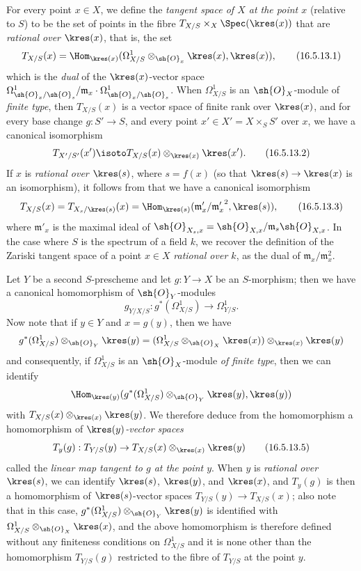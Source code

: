 \begin{env}[16.5.13]
\label{IV.16.5.13}
For every point $x \in X$, we define the \emph{tangent space of $X$ at the point $x$} (relative to $S$) to be the set of points in the fibre $T_{X/S} \times_X \Spec(\kres(x))$ that are \emph{rational over $\kres(x)$}, that is, the set
\[
\label{IV.16.5.13.1}
  T_{X/S}(x) = \Hom_{\kres(x)}(\Omega_{X/S}^1 \otimes_{\sh{O}_x} \kres(x), \kres(x)),
  \tag{16.5.13.1}
\]
which is the \emph{dual} of the $\kres(x)$-vector space $\Omega_{\sh{O}_x/\sh{O}_s}^1/\mathfrak{m}_x \cdot \Omega_{\sh{O}_x/\sh{O}_s}^1$.
When $\Omega_{X/S}^1$ is an $\sh{O}_X$-module of \emph{finite type}, then $T_{X/S}(x)$ is a vector space of finite rank over $\kres(x)$, and for every base change
$g : S' \to S$, and every point $x' \in X' = X \times_S S'$ over $x$, we have a canonical isomorphism
\[
  \label{IV.16.5.13.2}
  T_{X'/S'}(x') \isoto T_{X/S}(x) \otimes_{\kres(x)} \kres(x').
  \tag{16.5.13.2}
\]
If $x$ is \emph{rational over $\kres(s)$}, where $s = f(x)$ (so that $\kres(s) \to \kres(x)$ is an isomorphism), it follows from  that we have a canonical isomorphism
\[
\label{IV.16.5.13.3}
  T_{X/S}(x) = T_{X_s/\kres(s)}(x) = \Hom_{\kres(s)}(\mathfrak{m}'_x/{\mathfrak{m}'_x}^{2}, \kres(s)),
  \tag{16.5.13.3}
\]
where $\mathfrak{m}'_x$ is the maximal ideal of $\sh{O}_{X_s,x} = \sh{O}_{X, x}/\mathfrak{m}_s \sh{O}_{X,x}$.
In the case where $S$ is the spectrum of a field $k$, we recover the definition of the Zariski tangent space of a point $x \in X$ \emph{rational over $k$}, as the dual of $\mathfrak{m}_x / \mathfrak{m}_x^2$.

Let $Y$ be a second $S$-prescheme and let $g : Y \to X$ be an $S$-morphism;
then we have a canonical homomorphism of $\sh{O}_Y$-modules 
\[
\label{IV.16.5.13.4}
  g_{Y/X/S} : g^*(\Omega_{X/S}^1) \to \Omega_{Y/S}^1.
  \tag{16.5.13.4}
\]
Now note that if $y \in Y$ and $x = g(y)$, then we have
\[
  g^*(\Omega_{X/S}^1) \otimes_{\sh{O}_Y} \kres(y) = (\Omega_{X/S}^1 \otimes_{\sh{O}_X} \kres(x)) \otimes_{\kres(x)} \kres(y) 
\]
and consequently, if $\Omega_{X/S}^1$ is an $\sh{O}_X$-module \emph{of finite type}, then we can identify
\[
  \Hom_{\kres(y)}(g^*(\Omega_{X/S}^1) \otimes_{\sh{O}_Y} \kres(y), \kres(y))
\]
with $T_{X/S}(x) \otimes_{\kres(x)} \kres(y)$.
We therefore deduce from the homomorphism  a homomorphism of \emph{$\kres(y)$-vector spaces}
\[
\label{IV.16.5.13.5}
  T_y(g) : T_{Y/S}(y) \to T_{X/S}(x) \otimes_{\kres(x)} \kres(y)
  \tag{16.5.13.5}
\]
called the \emph{linear map tangent to $g$ at the point $y$}.
When $y$ is \emph{rational over $\kres(s)$}, we can identify $\kres(s)$, $\kres(y)$, and $\kres(x)$, and $T_y(g)$ is then a homomorphism of $\kres(s)$-vector spaces $T_{Y/S}(y) \to T_{X/S}(x)$;
also note that in this case, $g^*(\Omega_{X/S}^1) \otimes_{\sh{O}_Y} \kres(y)$ is identified with $\Omega_{X/S}^1 \otimes_{\sh{O}_X} \kres(x)$, and the above homomorphism is therefore defined without any finiteness conditions on $\Omega_{X/S}^1$ and it is none other than the homomorphism $T_{Y/S}(g)$  restricted to the fibre of $T_{Y/S}$ at the point $y$.
\end{env}


